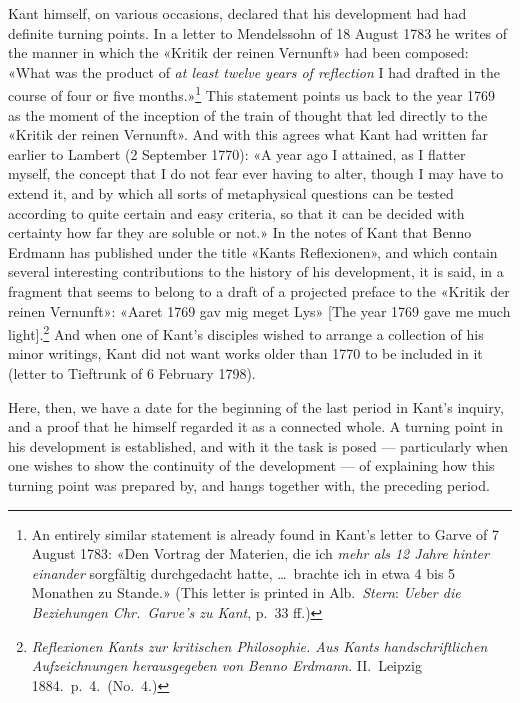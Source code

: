 \documentclass[12pt,a4paper]{article}
\begin{document}
Kant himself, on various occasions, declared that his development had had
definite turning points. In a letter to Mendelssohn of 18 August 1783 he
writes of the manner in which the «Kritik der reinen Vernunft» had been
composed: «What was the product of \emph{at least twelve years of reflection} I
had drafted in the course of four or five months.»\footnote{An entirely
similar statement is already found in Kant's letter to Garve of 7 August
1783: «Den Vortrag der Materien, die ich \emph{mehr als 12 Jahre hinter einander}
sorgfältig durchgedacht hatte, \ldots\ brachte ich in etwa 4 bis 5
Monathen zu Stande.» (This letter is printed in Alb.\ \emph{Stern}: \textit{Ueber
die Beziehungen Chr.\ Garve's zu Kant}, p.\ 33 ff.)} This statement points
us back to the year 1769 as the moment of the inception of the train of
thought that led directly to the «Kritik der reinen Vernunft». And with
this agrees what Kant had written far earlier to Lambert (2 September
1770): «A year ago I attained, as I flatter myself, the concept that I do
not fear ever having to alter, though I may have to extend it, and by
which all sorts of metaphysical questions can be tested according to quite
certain and easy criteria, so that it can be decided with certainty how
far they are soluble or not.» In the notes of Kant that Benno Erdmann has
published under the title «Kants Reflexionen», and which contain several
interesting contributions to the history of his development, it is said,
in a fragment that seems to belong to a draft of a projected preface to
the «Kritik der reinen Vernunft»: «Aaret 1769 gav mig meget Lys» [The year
1769 gave me much light].\footnote{\textit{Reflexionen Kants zur kritischen
Philosophie. Aus Kants handschriftlichen Aufzeichnungen herausgegeben von}
\emph{Benno Erdmann}. II.\ Leipzig 1884.\ p.\ 4.\ (No.\ 4.)} And when one of
Kant's disciples wished to arrange a collection of his minor writings,
Kant did not want works older than 1770 to be included in it (letter to
Tieftrunk of 6 February 1798).

Here, then, we have a date for the beginning of the last period in Kant's
inquiry, and a proof that he himself regarded it as a connected whole. A
turning point in his development is established, and with it the task is
posed --- particularly when one wishes to show the continuity of the
development --- of explaining how this turning point was prepared by, and
hangs together with, the preceding period.
\end{document}
